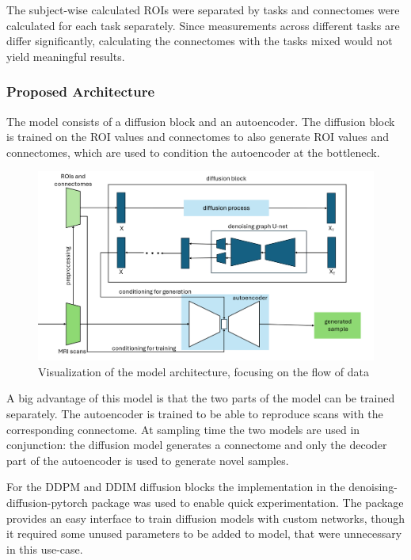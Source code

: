 	The subject-wise calculated ROIs were separated by tasks and connectomes were calculated for each task separately. Since measurements across different tasks are differ significantly, calculating the connectomes with the tasks mixed would not yield meaningful results.
	
	\subsubsection{Proposed Architecture}
	
	The model consists of a diffusion block and an autoencoder. The diffusion block is trained on the ROI values and connectomes to also generate ROI values and connectomes, which are used to condition the autoencoder at the bottleneck.
	
	\begin{figure}[!h]
		\centering
		\includegraphics[width=\textwidth]{figures/architecture.png}
		\caption{Visualization of the model architecture, focusing on the flow of data}
	\end{figure}
	
	A big advantage of this model is that the two parts of the model can be trained separately. The autoencoder is trained to be able to reproduce scans with the corresponding connectome. At sampling time  the two models are used in conjunction: the diffusion model generates a connectome and only the decoder part of the autoencoder is used to generate novel samples.
	
	For the DDPM and DDIM diffusion blocks the implementation in the denoising-diffusion-pytorch package was used to enable quick experimentation. The package provides an easy interface to train diffusion models with custom networks, though it required some unused parameters to be added to model, that were unnecessary in this use-case.
	
